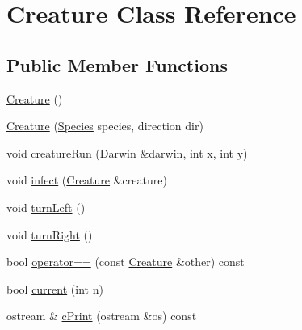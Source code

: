 \hypertarget{classCreature}{\section{Creature Class Reference}
\label{classCreature}
}
\subsection*{Public Member Functions}
\begin{DoxyCompactItemize}
\item 
\hyperlink{classCreature_a597cc3b08ee17de46c3e7ec3cf0d9b58}{Creature} ()
\item 
\hyperlink{classCreature_a4d2493119eae70cb0fb1b6d593af123a}{Creature} (\hyperlink{classSpecies}{Species} species, direction dir)
\item 
void \hyperlink{classCreature_a5344925bb09994ffe096d6288b05f091}{creature\-Run} (\hyperlink{classDarwin}{Darwin} \&darwin, int x, int y)
\item 
void \hyperlink{classCreature_a2e6f0894f4afd047a274cfb0f5d25d06}{infect} (\hyperlink{classCreature}{Creature} \&creature)
\item 
void \hyperlink{classCreature_a6775207403a361d6d25f5ee1db58ef94}{turn\-Left} ()
\item 
void \hyperlink{classCreature_a6d10fbf41bcf61c1cddc82400003f1e7}{turn\-Right} ()
\item 
bool \hyperlink{classCreature_adc7e51a6324e6260bec09006873b6d4c}{operator==} (const \hyperlink{classCreature}{Creature} \&other) const 
\item 
bool \hyperlink{classCreature_a5ee6576c030fc0f8b6b8fe50a11dd655}{current} (int n)
\item 
ostream \& \hyperlink{classCreature_ae2229815da7fb0830adc12f51ec0f70e}{c\-Print} (ostream \&os) const 
\end{DoxyCompactItemize}


